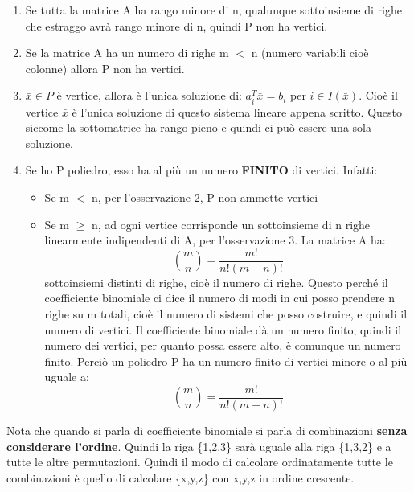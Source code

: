 \begin{enumerate}
    \item Se tutta la matrice A ha rango minore di n, qualunque sottoinsieme di righe che estraggo avrà rango minore di n, quindi P non ha vertici.
    \item Se la matrice A ha un numero di righe m $<$ n (numero variabili cioè colonne) allora P non ha vertici.
    \item $\bar{x} \in P$ è vertice, allora è l'unica soluzione di: $a_i^T\bar{x} = b_i$ per $i \in I(\bar{x})$. Cioè il vertice $\bar{x}$ è l'unica soluzione di questo sistema lineare appena scritto. Questo siccome la sottomatrice ha rango pieno e quindi ci può essere una sola soluzione.
    \item Se ho P poliedro, esso ha al più un numero \textbf{FINITO} di vertici. Infatti:
    \begin{itemize}
        \item Se m $<$ n, per l'osservazione 2, P non ammette vertici
        \item Se m $\geq$ n, ad ogni vertice corrisponde un sottoinsieme di n righe linearmente indipendenti di A, per l'osservazione 3. La matrice A ha:
        \begin{equation*}
            \binom{m}{n} = \frac{m!}{n!(m-n)!}
        \end{equation*}
        sottoinsiemi distinti di righe, cioè il numero di righe. Questo perché il coefficiente binomiale ci dice il numero di modi in cui posso prendere n righe su m totali, cioè il numero di sistemi che posso costruire, e quindi il numero di vertici. Il coefficiente binomiale dà un numero finito, quindi il numero dei vertici, per quanto possa essere alto, è comunque un numero finito. Perciò un poliedro P ha un numero finito di vertici minore o al più uguale a:
        \begin{equation*}
            \binom{m}{n} = \frac{m!}{n!(m-n)!}
        \end{equation*}
    \end{itemize}
\end{enumerate}
Nota che quando si parla di coefficiente binomiale si parla di combinazioni \textbf{senza considerare l'ordine}. Quindi la riga \{1,2,3\} sarà uguale alla riga \{1,3,2\} e a tutte le altre permutazioni. Quindi il modo di calcolare ordinatamente tutte le combinazioni è quello di calcolare \{x,y,z\} con x,y,z in ordine crescente.


